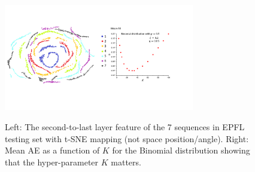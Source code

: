 \begin{figure}[t]
\centering
\includegraphics[width=8.3cm]{fig//fig5.pdf}\\
\caption{Left: The second-to-last layer feature of the 7 sequences in EPFL testing set with t-SNE mapping (not space position/angle). Right: Mean AE as a function of $K$ for the Binomial distribution showing that the hyper-parameter $K$ matters.}\label{fig:5}
\end{figure}





